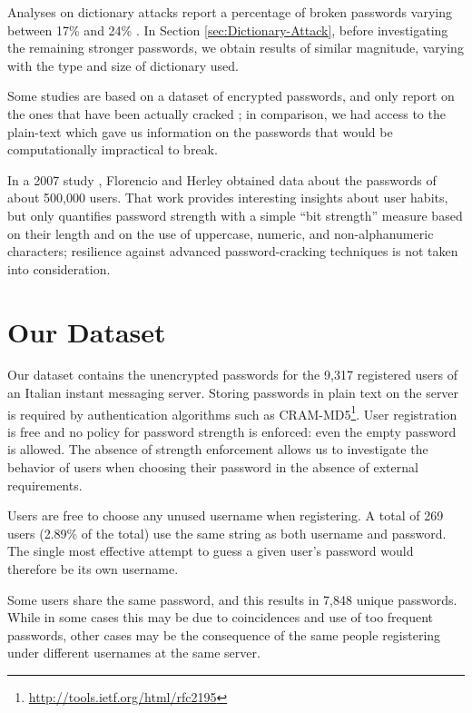 \documentclass[a4paper,twocolumn]{article}
\begin{document}
Analyses on dictionary attacks report a percentage of broken passwords
varying between 17\% and 24\% \cite{Morris1979Password,Klein1990Foiling,Spafford1992Observing}.
In Section \ref{sec:Dictionary-Attack}, before investigating the
remaining stronger passwords, we obtain results of similar magnitude,
varying with the type and size of dictionary used.

Some studies are based on a dataset of encrypted passwords, and only
report on the ones that have been actually cracked \cite{Klein1990Foiling,Narayanan2005Fast,Cazier2006Password,Marechal2008Advances};
in comparison, we had access to the plain-text which gave us information
on the passwords that would be computationally impractical to break.

In a 2007 study \cite{Florencio2007Largescale}, Florencio and Herley
obtained data about the passwords of about 500,000 users. That work
provides interesting insights about user habits, but only quantifies
password strength with a simple {}``bit strength'' measure based
on their length and on the use of uppercase, numeric, and non-alphanumeric
characters; resilience against advanced password-cracking techniques
is not taken into consideration.


\section{Our Dataset}

\label{sec:Our-Dataset}Our dataset contains the unencrypted passwords
for the 9,317 registered users of an Italian instant messaging server.
Storing passwords in plain text on the server is required by authentication
algorithms such as CRAM-MD5\footnote{\url{http://tools.ietf.org/html/rfc2195}}. User registration is free and no policy for password strength is
enforced: even the empty password is allowed. The absence of strength
enforcement allows us to investigate the behavior of users when choosing
their password in the absence of external requirements.

Users are free to choose any unused username when registering. A total
of 269 users (2.89\% of the total) use the same string as both username
and password. The single most effective attempt to guess a given user's
password would therefore be its own username.

Some users share the same password, and this results in 7,848 unique
passwords. While in some cases this may be due to coincidences and
use of too frequent passwords, other cases may be the consequence
of the same people registering under different usernames at the same
server.
\end{document}
